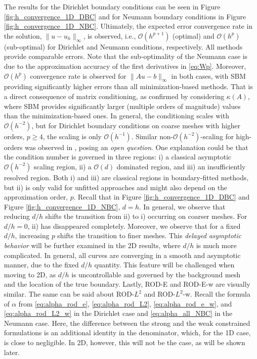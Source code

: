 \documentclass{article}
\begin{document}
The results for the Dirichlet boundary conditions can be seen in Figure \ref{fig:h_convergence_1D_DBC} and for Neumann boundary conditions in Figure \ref{fig:h_convergence_1D_NBC}. Ultimately, the expected error convergence rate in the solution, $\|u-u_h\|_{\infty}$, is observed, i.e., $\mathcal{O}(h^{p+1})$ (optimal) and $\mathcal{O}(h^{p})$ (sub-optimal) for Dirichlet and Neumann conditions, respectively. All methods provide comparable errors. Note that the sub-optimality of the Neumann case is due to the approximation accuracy of the first derivatives in \eqref{eq:Wp}. Moreover, $\mathcal{O}(h^{p})$ convergence rate is observed for $\|Au-b\|_{\infty}$ in both cases, with SBM providing significantly higher errors than all minimization-based methods. That is a direct consequence of matrix conditioning, as confirmed by considering $\kappa(A)$, where SBM provides significantly larger (multiple orders of magnitude) values than the minimization-based ones. In general, the conditioning scales with $\mathcal{O}(h^{-2})$, but for Dirichlet boundary conditions on coarse meshes with higher orders, $p \geq 4$, the scaling is only $\mathcal{O}(h^{-1})$. Similar non-$\mathcal{O}(h^{-2})$-scaling for high-orders was observed in \cite{gorgi2026isogeometric}, posing an \textit{open question}. One explanation could be that the condition number is governed in three regions: i) a classical asymptotic $\mathcal{O}(h^{-2})$ scaling region, ii) a $\mathcal{O}(d)$ dominated region, and iii) an insufficiently resolved region. Both i) and iii) are classical regions in boundary-fitted methods, but ii) is only valid for unfitted approaches and might also depend on the approximation order, $p$. Recall that in Figure \ref{fig:h_convergence_1D_DBC} and Figure \ref{fig:h_convergence_1D_NBC}, $d = h$. In general, we observe that reducing $d/h$ shifts the transition from ii) to i) occurring on coarser meshes. For $d/h = 0$, ii) has disappeared completely. Moreover, we observe that for a fixed $d/h$, increasing $p$ shifts the transition to finer meshes. This \textit{delayed asymptotic behavior} will be further examined in the 2D results, where $d/h$ is much more complicated. In general, all curves are converging in a smooth and asymptotic manner, due to the fixed $d/h$ quantity. This feature will be challenged when moving to 2D, as $d/h$ is uncontrollable and governed by the background mesh and the location of the true boundary. Lastly, ROD-E and ROD-E-w are visually similar. The same can be said about ROD-$L^2$ and ROD-$L^2$-w. Recall the formula of $\alpha$ from \eqref{eq:alpha_rod_e}, \eqref{eq:alpha_rod_L2}, \eqref{eq:alpha_rod_e_w}, and \eqref{eq:alpha_rod_L2_w} in the Dirichlet case and \eqref{eq:alpha_all_NBC} in the Neumann case. Here, the difference between the strong and the weak constrained formulations is an additional identity in the denominator, which, for the 1D case, is close to negligible. In 2D, however, this will not be the case, as will be shown later.
\end{document}
